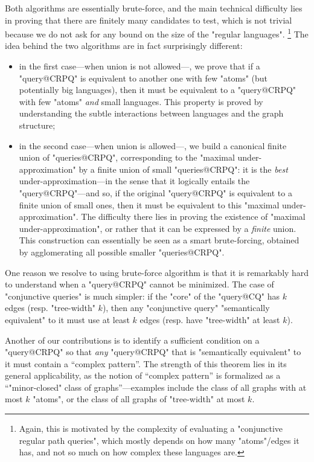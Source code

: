 Both algorithms are essentially brute-force, and the main technical difficulty
lies in proving that there are finitely many candidates to test, which is not
trivial because we do not ask for any bound on the size of the "regular languages".%
\footnote{Again, this is motivated by the complexity of evaluating
a "conjunctive regular path queries", which mostly depends on how many "atoms"/edges it has,
and not so much on how complex these languages are.}
The idea behind the two algorithms are in fact surprisingly different:
\begin{itemize}
	\item in the first case---when union is not allowed---, we prove that
		if a "query@CRPQ" is equivalent to another one with few
		"atoms" (but potentially big languages), then it must be
		equivalent to a "query@CRPQ" with few "atoms" \emph{and} small languages.
		This property is proved by understanding the subtle interactions between
		languages and the graph structure;
	\item in the second case---when union is allowed---, we build a canonical
		finite union of "queries@CRPQ", corresponding to the
		"maximal under-approximation" by a finite union of small "queries@CRPQ": 
		it is the \emph{best} under-approximation---in the sense that
		it logically entails the "query@CRPQ"---and so, if the original
		"query@CRPQ" is equivalent to a finite union of small ones, then
		it must be equivalent to this "maximal under-approximation".
		The difficulty there lies in proving the existence of "maximal under-approximation",
		or rather that it can be expressed by a \emph{finite} union.
		This construction can essentially be seen as a
		smart brute-forcing, obtained by agglomerating all possible smaller "queries@CRPQ".
\end{itemize}

One reason we resolve to using brute-force algorithm is that it is
remarkably hard to understand when a "query@CRPQ" cannot be minimized.
The case of "conjunctive queries" is much simpler: if the "core" 
of the "query@CQ" has $k$ edges (resp. "tree-width" $k$),
then any "conjunctive query" "semantically equivalent" to it must use at least $k$ edges
(resp. have "tree-width" at least $k$).

Another of our contributions is to identify a sufficient condition
on a "query@CRPQ" so that \emph{any} "query@CRPQ" that is "semantically equivalent" to it
must contain a ``complex pattern''. The strength of this theorem lies in its
general applicability, as the notion of ``complex pattern''
is formalized as a ``"minor-closed" class
of graphs''---examples include the class of all graphs with at most $k$ "atoms",
or the class of all graphs of "tree-width" at most $k$.

